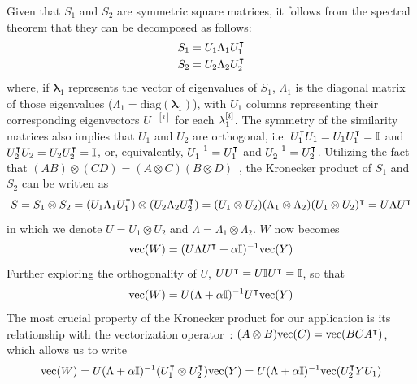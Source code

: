 Given that $S_1$ and $S_2$ are symmetric square matrices, it follows from the spectral theorem that they can be decomposed as follows:  %
%
\begin{gather*}
    S_1 = U_1 \Lambda_1 U_1^\intercal \\
    S_2 = U_2 \Lambda_2 U_2^\intercal
\end{gather*}
%
where, if $\mathbf{\lambda}_1$ represents the vector of eigenvalues of $S_1$, $\Lambda_1$ is the diagonal matrix of those eigenvalues ($\Lambda_1 = \text{diag}(\mathbf{\lambda}_1)$), with $U_1$ columns representing their corresponding eigenvectors $U^{\intercal[i]}$ for each $\mathbf{\lambda}_1^{[i]}$. The symmetry of the similarity matrices also implies that $U_1$ and $U_2$ are orthogonal, i.e. $U_1^\intercal U_1 = U_1 U_1^\intercal = \mathbb{I}$ and $U_2^\intercal U_2 = U_2 U_2^\intercal = \mathbb{I}$, or, equivalently, $U_1^{-1} = U_1^\intercal$ and $U_2^{-1} = U_2^\intercal$.
%
Utilizing the fact that $(AB) \otimes (CD) = (A \otimes C)(B \otimes D)$~\cite{schafer1966introduction}, the Kronecker product of $S_1$ and $S_2$ can be written as
%
\begin{equation}
    S = S_1 \otimes S_2
    = (U_1 \Lambda_1 U_1^\intercal) \otimes (U_2 \Lambda_2 U_2^\intercal)
    = (U_1 \otimes U_2) (\Lambda_1 \otimes \Lambda_2) (U_1 \otimes U_2)^\intercal
    = U \Lambda U^\intercal
\end{equation}
%
in which we denote $U = U_1 \otimes U_2$ and $\Lambda = \Lambda_1 \otimes \Lambda_2$.
$W$ now becomes
%
\begin{equation*}
    \text{vec}(W) = (U \Lambda U^\intercal + \alpha \mathbb{I})^{-1} \text{vec}(Y)
\end{equation*}
%
Further exploring the orthogonality of $U$, $U U^\intercal = U \mathbb{I} U^\intercal = \mathbb{I}$, so that
%
\begin{equation*}
    \text{vec}(W) = U (\Lambda + \alpha\mathbb{I})^{-1} U^\intercal \text{vec}(Y)
\end{equation*}
%
The most crucial property of the Kronecker product for our application is its relationship with the vectorization operator~\cite{schafer1966introduction}: $(A \otimes B)\text{vec} (C) = \text{vec}(BCA^\intercal)$, which allows us to write
%
\begin{equation*}
    \text{vec}(W)
    = U (\Lambda + \alpha\mathbb{I})^{-1} (U_1^\intercal \otimes U_2^\intercal) \text{vec}(Y)
    = U (\Lambda + \alpha\mathbb{I})^{-1} \text{vec}(U_2^\intercal Y U_1)
\end{equation*}
